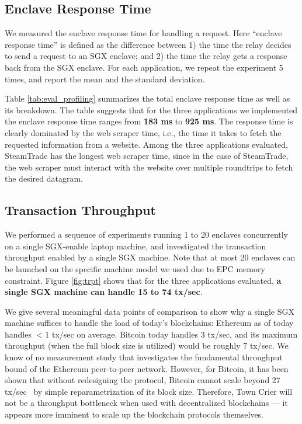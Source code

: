 \subsection{Enclave Response Time}
\label{subsec:response time}
We measured the enclave response time for handling a request. Here ``enclave response time''
is defined as the difference between 1) the time 
the relay decides to send a request to an SGX enclave;
and 2) the time the relay gets a response back from the SGX enclave. 
For each application, we repeat the  
experiment 5 times, and report the mean and the standard deviation.  

Table \ref{tab:eval_profiling} summarizes the total enclave response time as
well as its breakdown.  The table suggests that for the three applications we
implemented the enclave response time ranges from {\bf 183 ms} to {\bf 925 ms}.
The response time is clearly dominated by the web scraper time, i.e., the time
it takes to fetch the requested information from a website.  Among the three
applications evaluated, {\sf SteamTrade} has the longest web scraper time, since
in the case of {\sf SteamTrade}, the web scraper must interact with the website
over multiple roundtrips to fetch the desired datagram.

\subsection{Transaction Throughput}
We performed a sequence of experiments running 1 to 20 enclaves 
concurrently
on a single SGX-enable laptop
machine, and investigated the transaction throughput 
enabled by a single SGX machine. 
Note that at most 20 \tc enclaves can be launched
on the specific machine model we used due to EPC memory
constraint.
Figure \ref{fig:trpt}
shows that for the three applications evaluated,
{\bf a single SGX machine can handle
15 to 74
tx/sec}.

We give several meaningful data points of comparison to show
why a single SGX machine suffices to handle the load of
today's blockchains: 
Ethereum as of today handles 
$< 1$ tx/sec on average. 
Bitcoin today handles
3 tx/sec, and 
its maximum throughput (when the full block size is utilized)
would be roughly 7 tx/sec.
We know of no measurement study that 
investigates the fundamental 
throughput bound of the Ethereum  peer-to-peer network.
However, for Bitcoin, it has been shown that without
redesigning the protocol, 
Bitcoin cannot scale beyond  
27 tx/sec~\cite{blockchainscaling}
by simple reparametrization of its block size.
Therefore, Town Crier will not be a throughput 
bottleneck when used 
with decentralized blockchains --- it appears 
more imminent to scale up 
the blockchain protocols themselves.

